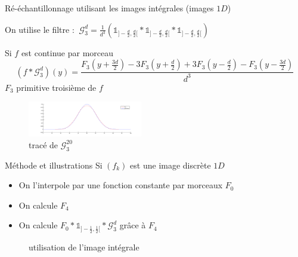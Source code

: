 \documentclass[c,12pt]{beamer}
\begin{document}
\begin{frame}{Ré-échantillonnage utilisant les images intégrales (images $1D$)}
\small{
On utilise le filtre :
$~
\mathcal{G}_3^d= \frac{1}{d^3}(\mathds{1}_{]-\frac{d}{2},\frac{d}{2}[} * \mathds{1}_{]-\frac{d}{2},\frac{d}{2}[} * \mathds{1}_{]-\frac{d}{2},\frac{d}{2}[})
$
\begin{block}{Si $f$ est continue par morceau}
\begin{equation*}
(f*\mathcal{G}_3^d)(y)=\frac{F_3(y+\frac{3d}{2})-3F_3(y+\frac{d}{2})+3F_3(y-\frac{d}{2})-F_3(y-\frac{3d}{2})}{d^3}
\end{equation*}
$F_3$ primitive troisième de $f$
\end{block}}
\begin{figure}
\centering
\includegraphics[width=5cm]{filtre_g3.png}
\caption{tracé de $\mathcal{G}_3^{20}$}
\end{figure}
\end{frame}
\begin{frame}{Méthode et illustrations}
Si $(f_k)$ est une image discrète $1D$ 
\begin{itemize}
\item On l'interpole par une fonction constante par morceaux $F_0$
\item On calcule $F_4$   
\item On calcule $F_0 *\mathds{1}_{]-\frac{1}{2},\frac{1}{2}[}*\mathcal{G}_3^d$ grâce à $F_4$
\end{itemize}
\begin{figure}
\centering
{}
\caption{utilisation de l'image intégrale}
\end{figure}
\end{frame}
\end{document}
